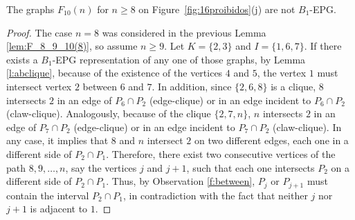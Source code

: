 \documentclass{dmgt}
\begin{document}
  \begin{lemma}\label{lem:F_10(n)}
The graphs  $F_{10}(n)$ for $n \geq 8$ on Figure~\ref{fig:16proibidos}(j) are not   $B_1$-EPG.
\end{lemma}
\begin{proof} The case $n=8$ was considered  in the previous Lemma \ref{lem:F_8_9_10(8)}, so assume $n\geq 9$.   Let $K=\{2,3\}$ and $I=\{1,6,7\}$. If there exists a $B_1$-EPG representation of any one of those graphs,  by Lemma \ref{l:abclique},  because of the existence of the vertices  $4$ and $5$, the vertex $1$ must intersect  vertex $2$ between $6$ and $7$. In addition, since $\{2,6,8\}$ is a clique, $8$ intersects $2$ in an edge of $P_6\cap P_2$ (edge-clique) or in an edge incident to $P_6\cap P_2$ (claw-clique). Analogously, because of the clique $\{2,7,n\}$,  $n$ intersects $2$ in an edge of $P_7\cap P_2$ (edge-clique) or in an edge incident to $P_7\cap P_2$ (claw-clique). In any case, it implies that $8$  and $n$ intersect $2$ on two different edges, each one in a different side of $P_2 \cap P_1$. Therefore, there exist two consecutive vertices of the path $8, 9, \ldots, n$, say the vertices $j$ and $j+1$, such that each one intersects $P_2$ on a different side of $P_2 \cap P_1$. Thus, by Observation \ref{f:between}, $P_j$ or $P_{j+1}$ must contain the interval  $P_2 \cap P_1$, in contradiction with the fact that neither $j$ nor $j+1$ is adjacent to $1$.
 \end{proof} 



%
\end{document}
